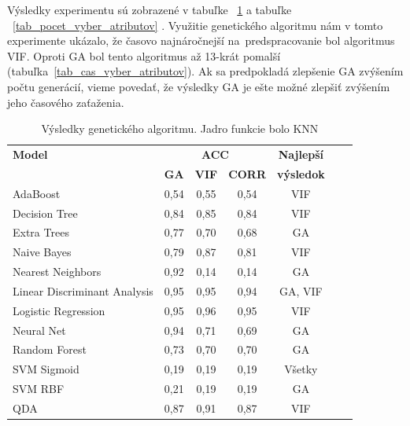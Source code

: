 \documentclass[runningheads]{llncs}
\begin{document}
Výsledky experimentu sú zobrazené v tabuľke ~\ref{tab_nastavenie_vyhodnotenie_experimentu} 
a tabuľke ~\ref{tab_pocet_vyber_atributov} . Využitie genetického algoritmu
nám v tomto experimente ukázalo, že časovo najnáročnejší na~predspracovanie bol algoritmus 
VIF. Oproti GA bol tento algoritmus až 13-krát pomalší (tabuľka~\ref{tab_cas_vyber_atributov}). Ak sa predpokladá zlepšenie GA zvýšením počtu generácií, vieme povedať, že výsledky GA je ešte možné zlepšiť 
zvýšením jeho časového zaťaženia. 


\begin{table}[]
    \centering
    \caption{Výsledky genetického algoritmu. Jadro funkcie bolo KNN}\label{tab_nastavenie_vyhodnotenie_experimentu}
    \begin{tabular}{|l|c|c|c|c|c|c|}   
    \hline
    \textbf{Model}               & \multicolumn{3}{c|}{\textbf{ACC}}                       & \textbf{ Najlepší  } \\ 
                                 & \textbf{GA} & \textbf{VIF} & \textbf{CORR}& \textbf{výsledok}  \\ \hline
    AdaBoost                     & 0,54        & 0,55         & 0,54       & VIF   \\ \hline
    Decision Tree                & 0,84        & 0,85         & 0,84       & VIF     \\ \hline
    Extra Trees                  & 0,77        & 0,70         & 0,68       & GA       \\ \hline
    Naive Bayes                  & 0,79        & 0,87         & 0,81       & VIF        \\ \hline
    Nearest Neighbors            & 0,92        & 0,14         & 0,14       & GA            \\ \hline
    Linear Discriminant Analysis & 0,95        & 0,95         & 0,94       & GA, VIF              \\ \hline
    Logistic Regression          & 0,95        & 0,96         & 0,95       & VIF         \\ \hline
    Neural Net                   & 0,94        & 0,71         & 0,69       & GA           \\ \hline
    Random Forest                & 0,73        & 0,70         & 0,70       & GA              \\ \hline
    SVM Sigmoid                  & 0,19        & 0,19         & 0,19       & Všetky         \\ \hline
    SVM RBF                      & 0,21        & 0,19         & 0,19       & GA           \\ \hline
    QDA                          & 0,87        & 0,91         & 0,87       & VIF           \\ \hline
    \end{tabular}
\end{table}
\end{document}
